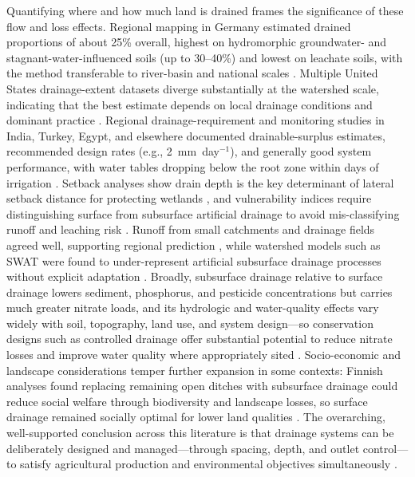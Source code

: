 Quantifying where and how much land is drained frames the significance of these
flow and loss effects. Regional mapping in Germany estimated drained proportions
of about 25\% overall, highest on hydromorphic groundwater- and
stagnant-water-influenced soils (up to 30--40\%) and lowest on leachate soils,
with the method transferable to river-basin and national scales
\parencite{Hirt2005,Hirt2011}. Multiple United States drainage-extent datasets
diverge substantially at the watershed scale, indicating that the best estimate
depends on local drainage conditions and dominant practice
\parencite{Jame2022}. Regional drainage-requirement and monitoring studies in
India, Turkey, Egypt, and elsewhere documented drainable-surplus estimates,
recommended design rates (e.g., 2~mm~day$^{-1}$), and generally good system
performance, with water tables dropping below the root zone within days of
irrigation \parencite{Kumar2006,Güngör2023,Ali2001,MartínezBeltrán2007,Rimidis2003}.
Setback analyses show drain depth is the key determinant of lateral setback
distance for protecting wetlands \parencite{Tangen2018}, and vulnerability
indices require distinguishing surface from subsurface artificial drainage to
avoid mis-classifying runoff and leaching risk \parencite{Baffaut2020}. Runoff
from small catchments and drainage fields agreed well, supporting regional
prediction \parencite{Veinbergs2022}, while watershed models such as SWAT were
found to under-represent artificial subsurface drainage processes without
explicit adaptation \parencite{Manguerra1998,Golmohammadi2016}. Broadly,
subsurface drainage relative to surface drainage lowers sediment, phosphorus, and
pesticide concentrations but carries much greater nitrate loads, and its
hydrologic and water-quality effects vary widely with soil, topography, land use,
and system design---so conservation designs such as controlled drainage offer
substantial potential to reduce nitrate losses and improve water quality where
appropriately sited \parencite{Blann2009,Gramlich2018,FAUSEY1995,SKAGGS1994}.
Socio-economic and landscape considerations temper further expansion in some
contexts: Finnish analyses found replacing remaining open ditches with subsurface
drainage could reduce social welfare through biodiversity and landscape losses,
so surface drainage remained socially optimal for lower land qualities
\parencite{HietalaKoivu2004,Saikkonen2014}. The overarching, well-supported
conclusion across this literature is that drainage systems can be deliberately
designed and managed---through spacing, depth, and outlet control---to satisfy
agricultural production and environmental objectives simultaneously
\parencite{Skaggs1995,Breve1998,ElSadek2002b,Strock2011,Ritzema2016}.